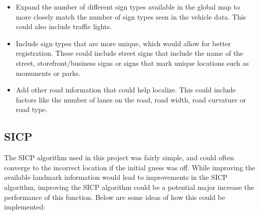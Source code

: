 \documentclass[letterpaper, 10 pt, conference]{ieeeconf}  %
\begin{document}
\begin{itemize}
\item Expand the number of different sign types available in the global map to more closely match the number of sign types seen in the vehicle data. This could also include traffic lights.
\item Include sign types that are more unique, which would allow for better registration. These could include street signs that include the name of the street, storefront/business signs or signs that mark unique locations such as monuments or parks.
\item Add other road information that could help localize. This could include factors like the number of lanes on the road, road width, road curvature or road type.
\end{itemize}

\subsection{SICP}
The SICP algorithm used in this project was fairly simple, and could often converge to the incorrect location if the initial guess was off. While improving the available landmark information would lead to improvements in the SICP algorithm, improving the SICP algorithm could be a potential major increase the performance of this function. Below are some ideas of how this could be implemented:
\end{document}
